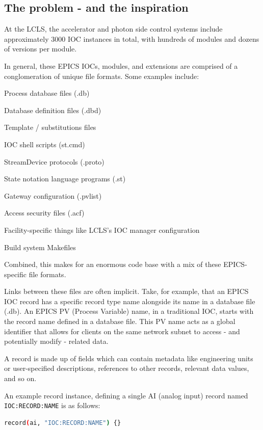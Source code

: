 \documentclass[letter,
               keeplastbox,   %
               ]{jacow}
\begin{document}
\subsection{The problem - and the inspiration}

At the LCLS, the accelerator and photon side control systems include
approximately 3000 IOC instances in total, with hundreds of modules and
dozens of versions per module.

In general, these EPICS IOCs, modules, and extensions are comprised of a
conglomeration of unique file formats. Some examples include:

\begin{Itemize}
  \item Process database files (.db)
  \item Database definition files (.dbd)
  \item Template / substitutions files
  \item IOC shell scripts (st.cmd)
  \item StreamDevice protocols (.proto)
  \item State notation language programs (.st)
  \item Gateway configuration (.pvlist)
  \item Access security files (.acf)
  \item Facility-specific things like LCLS’s IOC manager configuration
  \item Build system Makefiles
\end{Itemize}

Combined, this makes for an enormous code base with a mix of these
EPICS-specific file formats.

Links between these files are often implicit.  Take, for example, that an EPICS
IOC record has a specific record type name alongside its name in a database
file (.db).  An EPICS PV (Process Variable) name, in a traditional IOC, starts
with the record name defined in a database file. This PV name acts as a global
identifier that allows for clients on the same network subnet to access - and
potentially modify - related data.

A record is made up of fields which can contain metadata like engineering units
or user-specified descriptions, references to other records, relevant data
values, and so on.

An example record instance, defining a single AI (analog input) record named
\verb_IOC:RECORD:NAME_ is as follows:
\begin{lstlisting}[language=bash]
  record(ai, "IOC:RECORD:NAME") {}
\end{lstlisting}
\end{document}
